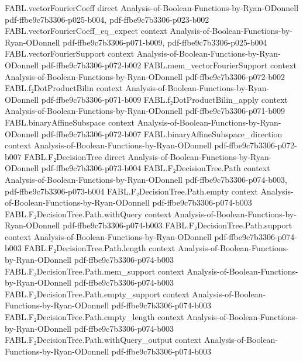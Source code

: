 \begin{theorem}
\proofstep
  {FABL.vectorFourierCoeff}
  {direct}
  {Analysis-of-Boolean-Functions-by-Ryan-ODonnell}
  {pdf-ffbe9c7b3306-p025-b004,
    pdf-ffbe9c7b3306-p023-b002}
\proofstep
  {FABL.vectorFourierCoeff_eq_expect}
  {context}
  {Analysis-of-Boolean-Functions-by-Ryan-ODonnell}
  {pdf-ffbe9c7b3306-p071-b009,
    pdf-ffbe9c7b3306-p025-b004}
\proofstep
  {FABL.vectorFourierSupport}
  {context}
  {Analysis-of-Boolean-Functions-by-Ryan-ODonnell}
  {pdf-ffbe9c7b3306-p072-b002}
\proofstep
  {FABL.mem_vectorFourierSupport}
  {context}
  {Analysis-of-Boolean-Functions-by-Ryan-ODonnell}
  {pdf-ffbe9c7b3306-p072-b002}
\proofstep
  {FABL.f₂DotProductBilin}
  {context}
  {Analysis-of-Boolean-Functions-by-Ryan-ODonnell}
  {pdf-ffbe9c7b3306-p071-b009}
\proofstep
  {FABL.f₂DotProductBilin_apply}
  {context}
  {Analysis-of-Boolean-Functions-by-Ryan-ODonnell}
  {pdf-ffbe9c7b3306-p071-b009}
\proofstep
  {FABL.binaryAffineSubspace}
  {context}
  {Analysis-of-Boolean-Functions-by-Ryan-ODonnell}
  {pdf-ffbe9c7b3306-p072-b007}
\proofstep
  {FABL.binaryAffineSubspace_direction}
  {context}
  {Analysis-of-Boolean-Functions-by-Ryan-ODonnell}
  {pdf-ffbe9c7b3306-p072-b007}
\proofstep
  {FABL.F₂DecisionTree}
  {direct}
  {Analysis-of-Boolean-Functions-by-Ryan-ODonnell}
  {pdf-ffbe9c7b3306-p073-b004}
\proofstep
  {FABL.F₂DecisionTree.Path}
  {context}
  {Analysis-of-Boolean-Functions-by-Ryan-ODonnell}
  {pdf-ffbe9c7b3306-p074-b003,
    pdf-ffbe9c7b3306-p073-b004}
\proofstep
  {FABL.F₂DecisionTree.Path.empty}
  {context}
  {Analysis-of-Boolean-Functions-by-Ryan-ODonnell}
  {pdf-ffbe9c7b3306-p074-b003}
\proofstep
  {FABL.F₂DecisionTree.Path.withQuery}
  {context}
  {Analysis-of-Boolean-Functions-by-Ryan-ODonnell}
  {pdf-ffbe9c7b3306-p074-b003}
\proofstep
  {FABL.F₂DecisionTree.Path.support}
  {context}
  {Analysis-of-Boolean-Functions-by-Ryan-ODonnell}
  {pdf-ffbe9c7b3306-p074-b003}
\proofstep
  {FABL.F₂DecisionTree.Path.length}
  {context}
  {Analysis-of-Boolean-Functions-by-Ryan-ODonnell}
  {pdf-ffbe9c7b3306-p074-b003}
\proofstep
  {FABL.F₂DecisionTree.Path.mem_support}
  {context}
  {Analysis-of-Boolean-Functions-by-Ryan-ODonnell}
  {pdf-ffbe9c7b3306-p074-b003}
\proofstep
  {FABL.F₂DecisionTree.Path.empty_support}
  {context}
  {Analysis-of-Boolean-Functions-by-Ryan-ODonnell}
  {pdf-ffbe9c7b3306-p074-b003}
\proofstep
  {FABL.F₂DecisionTree.Path.empty_length}
  {context}
  {Analysis-of-Boolean-Functions-by-Ryan-ODonnell}
  {pdf-ffbe9c7b3306-p074-b003}
\proofstep
  {FABL.F₂DecisionTree.Path.withQuery_output}
  {context}
  {Analysis-of-Boolean-Functions-by-Ryan-ODonnell}
  {pdf-ffbe9c7b3306-p074-b003}

\end{theorem}
